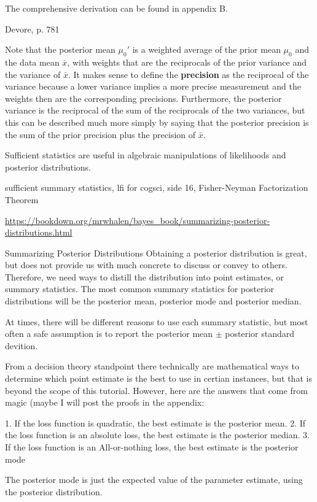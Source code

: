 The comprehensive derivation can be found in appendix B. 

Devore, p. 781 

Note that the posterior mean $\mu_0'$ is a weighted average of the prior mean $\mu_0$ and the data mean $\bar{x}$, with weights that are the reciprocals of the prior variance and the variance of $\bar{x}$. It makes sense to define the \textbf{precision} as the reciprocal of the variance because a lower variance implies a more precise measurement and the weights then are the corresponding precisions. Furthermore, the posterior variance is the reciprocal of the sum of the reciprocals of the two variances, but this can be described much more simply by saying that the posterior precision is the sum of the prior precision plus the precision of $\bar{x}$.  


Sufficient statistics are useful in algebraic manipulations of likelihoods and posterior distributions.

sufficient summary statistics, lfi for cogsci, side 16, Fisher-Neyman Factorization Theorem

\url{https://bookdown.org/mrwhalen/bayes_book/summarizing-posterior-distributions.html}

Summarizing Posterior Distributions
Obtaining a posterior distribution is great, but does not provide us with much concrete to discuss or convey to others. Therefore, we need ways to distill the distribution into point estimates, or summary statistics. The most common summary statistics for posterior distributions will be the posterior mean, posterior mode and posterior median.

At times, there will be different reasons to use each summary statistic, but most often a safe assumption is to report the posterior mean $\pm$ posterior standard devition.

From a decision theory standpoint there technically are mathematical ways to determine which point estimate is the best to use in certian instances, but that is beyond the scope of this tutorial. However, here are the answers that come from magic (maybe I will post the proofs in the appendix:

1. If the loss function is quadratic, the best estimate is the posterior mean.
2. If the loss function is an absolute loss, the best estimate is the posterior median.
3. If the loss function is an All-or-nothing loss, the best estimate is the posterior mode

The posterior mode is just the expected value of the parameter estimate, using the posterior distribution.

